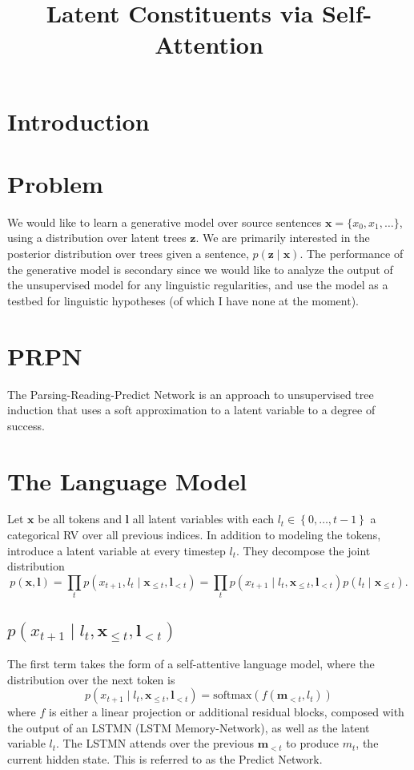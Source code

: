 \documentclass{article}
\title{Latent Constituents via Self-Attention}
\newcommand\set[1]{\left\{#1\right\}}
\newcommand{\bl}{\mathbf{l}}
\newcommand{\bx}{\mathbf{x}}
\newcommand{\bz}{\mathbf{z}}
\begin{document}
\maketitle

\section{Introduction}


\section{Problem}
We would like to learn a generative model
over source sentences $\bx = \{x_0, x_1, \ldots\}$,
using a distribution over latent trees $\bz$.  
We are primarily interested in the posterior distribution over trees given a sentence, $p(\bz\mid\bx)$.
The performance of the generative model is secondary since we would like to analyze the
output of the unsupervised model for any linguistic regularities, and use the model as a 
testbed for linguistic hypotheses (of which I have none at the moment).

\citep{shen2018prpn}
\citet{yin18structvae}

\section{PRPN \citep{shen2018prpn}}
The Parsing-Reading-Predict Network \citep{shen2018prpn} is an approach to unsupervised tree induction
that uses a soft approximation to a latent variable to a degree of success.

\section{The Language Model}
Let $\bx$ be all tokens
and $\bl$ all latent variables with each $l_t\in\set{0,\ldots,t-1}$ a categorical RV over all previous indices.
In addition to modeling the tokens,
\citet{shen2018prpn} introduce a latent variable at every timestep $l_t$. 
They decompose the joint distribution 
\begin{equation}
p(\bx, \bl)
= \prod_t p(x_{t+1},l_t\mid\bx_{\le t},\bl_{<t})
= \prod_t p(x_{t+1}\mid l_t,\bx_{\le t},\bl_{<t})p(l_t\mid\bx_{\le t}).
\end{equation}

\subsection{$p(x_{t+1}\mid l_t,\bx_{\le t},\bl_{<t})$}
The first term takes the form of a self-attentive language model,
where the distribution over the next token is
$$p(x_{t+1}\mid l_t,\bx_{\le t},\bl_{<t}) = \textrm{softmax}(f(\bm{m}_{<t}, l_t))$$
where $f$ is either a linear projection or additional residual blocks,
composed with the output of an LSTMN (LSTM Memory-Network),
as well as the latent variable $l_t$.
The LSTMN attends over the previous $\bm{m}_{<t}$ to produce $m_t$,
the current hidden state.
This is referred to as the Predict Network.
\end{document}
